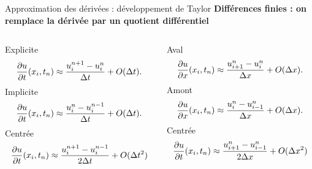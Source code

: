 \documentclass[aspectratio=169, french]{beamer}
\begin{document}
\begin{frame}{Approximation des dérivées : développement de Taylor}
	\textbf{Différences finies : on remplace la dérivée par un quotient différentiel}
	
	
	\begin{columns}
		\begin{column}{.5\textwidth}
			\begin{tcolorbox}[title=Discrétisation en temps, coltitle=white]
				Explicite
				\begin{equation*}
					\begin{aligned}
						\diffp{u}{t}(x_i, t_n) \approx \frac{u_{i}^{n+1} - u_{i}^{n}}{\Delta t} + O(\Delta t).
					\end{aligned}
				\end{equation*}
				Implicite
				\begin{equation*}
					\begin{aligned}
						\diffp{u}{t}(x_i, t_n) \approx \frac{u_{i}^{n} - u_{i}^{n-1}}{\Delta t} + O(\Delta t).
					\end{aligned}
				\end{equation*}
				Centrée
				\begin{equation*}
					\begin{aligned}
						\diffp{u}{t}(x_i, t_n) \approx \frac{u_{i}^{n+1} - u_{i}^{n-1}}{2\Delta t} + O(\Delta t^2)
					\end{aligned}
				\end{equation*}
			\end{tcolorbox}
		\end{column}
		\begin{column}{.5\textwidth}
			\begin{tcolorbox}[title=Discrétisation en espace, coltitle=white]
				Aval
				\begin{equation*}
					\diffp{u}{x}(x_i, t_n) \approx \frac{u_{i+1}^{n} - u_{i}^n}{\Delta x} + O(\Delta x).
				\end{equation*}
				Amont
				\begin{equation*}
					\diffp{u}{x}(x_i, t_n) \approx \frac{u_{i}^{n} - u_{i-1}^{n}}{\Delta x} + O(\Delta x).
				\end{equation*}
				Centrée
				\begin{equation*}
					\diffp{u}{t}(x_i, t_n) \approx \frac{u_{i+1}^{n} - u_{i-1}^{n}}{2\Delta x} + O(\Delta x^2)
				\end{equation*}
			\end{tcolorbox}
			\end{column}
		\end{columns}	
	
	
\end{frame}
\end{document}
